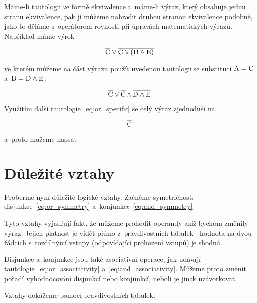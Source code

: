 Máme-li tautologii ve formě ekvivalence a~máme-li výraz, který obsahuje jednu stranu ekvivalence, pak ji můžeme nahradit druhou stranou ekvivalence podobně, jako to děláme s~operátorem rovnosti při úpravách matematických výrazů. Například máme výrok

\begin{equation}
\overline{\mathrm{C}} \lor \overline{\mathrm{C} \lor (\mathrm{D} \land \mathrm{E})}
\end{equation}

ve kterém můžeme na část výrazu použít uvedenou tautologii se substitucí \(\mathrm{A} = \mathrm{C}\) a~\(\mathrm{B} = \mathrm{D} \land \mathrm{E}\):

\begin{equation}
\overline{\mathrm{C}} \lor \overline{\mathrm{C}} \land \overline{\mathrm{D} \land \mathrm{E}}
\end{equation}

Využitím další tautologie~\eqref{eq:or_specific} se celý výraz zjednoduší na

\begin{equation}
\overline{\mathrm{C}}
\end{equation}

a~proto můžeme napsat


\section{Důležité vztahy}

Proberme nyní důležité logické vztahy. Začněme symetričností disjunkce~\eqref{eq:or_symmetry} a~konjunkce~\eqref{eq:and_symmetry}:


Tyto vztahy vyjadřují fakt, že můžeme prohodit operandy aniž bychom změnily výraz. Jejich platnost je vidět přímo z~pravdivostních tabulek - hodnota na dvou řádcích s~rozdílnýmí vstupy (odpovídající prohození vstupů) je shodná.

Disjunkce a~konjunkce jsou také asociativní operace, jak udávají tautologie~\eqref{eq:or_associativity} a~\eqref{eq:and_associativity}. Můžeme proto změnit pořadí vyhodnocování disjunkcí nebo konjunkcí, neboli je jinak uzávorkovat.


Vztahy dokážeme pomocí pravdivostních tabulek:

